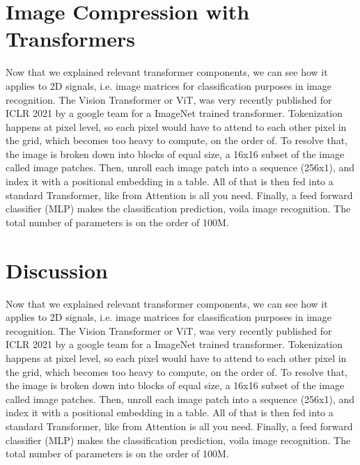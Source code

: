 \documentclass[pdftex,11pt,titlepage,twoside,openright]{report}
\begin{document}
\chapter{Image Compression with Transformers}

Now that we explained relevant transformer components, we can see how it applies to 2D signals, i.e. image matrices for classification purposes in image recognition.
The Vision Transformer or ViT, was very recently published for ICLR 2021 by a google team for a ImageNet trained transformer.
Tokenization happens at pixel level, so each pixel would have to attend to  each other pixel in the grid, which becomes too heavy to compute, on the order of. 
To resolve that, the image is broken down into blocks of equal size, a 16x16 subset of the image called image patches. Then, unroll each image patch into a sequence (256x1), and index it with a positional embedding in a table. All of that is then fed into a standard Transformer, like from Attention is all you need. Finally, a feed forward classifier (MLP) makes the classification prediction, voila image recognition.
The total number of parameters is on the order of 100M.

\newpage


%
%
\cleardoublepage
\chapter{Discussion}

Now that we explained relevant transformer components, we can see how it applies to 2D signals, i.e. image matrices for classification purposes in image recognition.
The Vision Transformer or ViT, was very recently published for ICLR 2021 by a google team for a ImageNet trained transformer.
Tokenization happens at pixel level, so each pixel would have to attend to  each other pixel in the grid, which becomes too heavy to compute, on the order of. 
To resolve that, the image is broken down into blocks of equal size, a 16x16 subset of the image called image patches. Then, unroll each image patch into a sequence (256x1), and index it with a positional embedding in a table. All of that is then fed into a standard Transformer, like from Attention is all you need. Finally, a feed forward classifier (MLP) makes the classification prediction, voila image recognition.
The total number of parameters is on the order of 100M.
\end{document}
